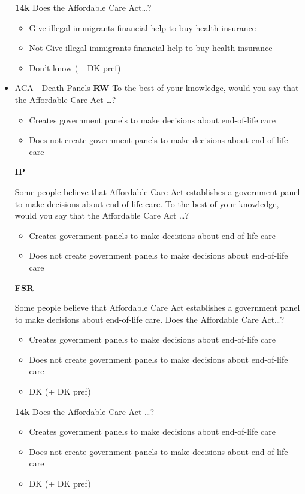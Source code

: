 \documentclass[12pt, letterpaper]{article}
\begin{document}
\begin{itemize}
\textbf{14k}\newline
Does the Affordable Care Act\ldots?
\begin{itemize}
	\item Give illegal immigrants financial help to buy health insurance
	\item Not Give illegal immigrants financial help to buy health insurance
	\item Don't know (+ DK pref)
\end{itemize}

\item ACA—Death Panels\newline
\textbf{RW}\newline
To the best of your knowledge, would you say that the Affordable Care Act \ldots?
\begin{itemize}
	\item Creates government panels to make decisions about end-of-life care
	\item Does not create government panels to make decisions about end-of-life care
\end{itemize}

\textbf{IP}\newline 

Some people believe that Affordable Care Act establishes a government panel to
make decisions about end-of-life care. To the best of your knowledge, would you say
that the Affordable Care Act \ldots?
\begin{itemize}
	\item Creates government panels to make decisions about end-of-life care
	\item Does not create government panels to make decisions about end-of-life care
\end{itemize}

\textbf{FSR}\newline

Some people believe that Affordable Care Act establishes a government panel to
make decisions about end-of-life care. Does the Affordable Care Act\ldots?
\begin{itemize}
	\item Creates government panels to make decisions about end-of-life care
	\item Does not create government panels to make decisions about end-of-life care
	\item DK (+ DK pref)
\end{itemize}

\textbf{14k}\newline
Does the Affordable Care Act \ldots?
\begin{itemize}
	\item Creates government panels to make decisions about end-of-life care
	\item Does not create government panels to make decisions about end-of-life care
	\item DK (+ DK pref)
\end{itemize}


\end{itemize}
\end{document}
